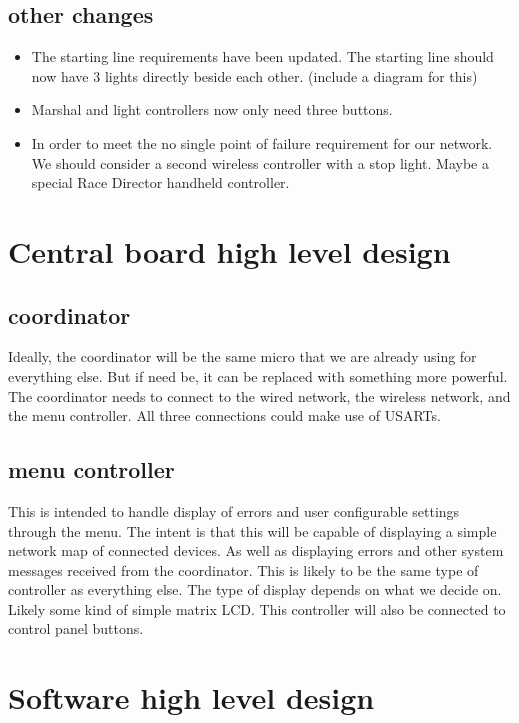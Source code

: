 \documentclass{article}
\begin{document}
     \subsection{other changes}
     \begin{itemize}
     	\item The starting line requirements have been updated. 
     	The starting line should now have 3 lights directly beside each other.
     	(include a diagram for this)
     	\item Marshal and light controllers now only need three buttons.
     	\item In order to meet the no single point of failure requirement for our network.
     	We should consider a second wireless controller with a stop light. Maybe a special Race Director handheld controller.
     \end{itemize}
     \section{Central board high level design}
     \subsection{coordinator}
     Ideally, the coordinator will be the same micro that we are already using for everything else.
     But if need be, it can be replaced with something more powerful.
     The coordinator needs to connect to the wired network, the wireless network, and the menu controller.
     All three connections could make use of USARTs.
     \subsection{menu controller}
     This is intended to handle display of errors and user configurable settings through the menu.
     The intent is that this will be capable of displaying a simple network map of connected devices.
     As well as displaying errors and other system messages received from the coordinator.
     This is likely to be the same type of controller as everything else.
     The type of display depends on what we decide on. Likely some kind of simple matrix LCD.
     This controller will also be connected to control panel buttons.
     
     \section{Software high level design}
\end{document}
